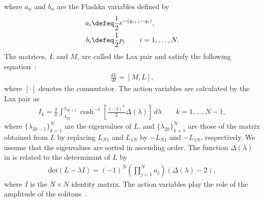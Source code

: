 where $a_n$ and $b_n$ are the Flashka variables defined by~\cite{Flaschka1974}
\begin{align}
  \begin{split}
    a_i & \defeq \frac{1}{2}e^{-(q_{i+1} - q_i)}, \\
    b_i & \defeq \frac{1}{2}p_i \qquad i=1,\ldots,N.
  \end{split}
\end{align}
The matrices, $L$ and $M$, are called the Lax pair and satisfy the following equation~\cite{Lax1968}:
\begin{align}
 \frac{dL}{dt} = [M, L],\label{eq:eom_lax_pair}
\end{align}
where $[\cdot]$ denotes the commutator.
The action variables are calculated by the Lax pair as~\cite{Flaschka-McLaughlin1976,Flaschka1974}
\begin{align}
  I_k = \frac{2}{\pi} \int_{\lambda_{2k}}^{\lambda_{2k+1}} \cosh^{-1}\left[\frac{(-1)^k}{2} \Delta(\lambda)\right] \, d\lambda \qquad k=1,\ldots,N-1, \label{eq:exact_toda_actions}
\end{align}
where $\{\lambda_{2k-1}\}_{k=1}^{N}$ are the eigenvalues of $L$, and $\{\lambda_{2k}\}_{k=1}^{N}$ are those of the matrix obtained from $L$ by replacing $L_{N1}$ and $L_{1N}$ by $-L_{N1}$ and $-L_{1N}$, respectively. We assume that the eigenvalues are sorted in ascending order.
The function $\Delta(\lambda)$ in  is related to the determinant of $L$ by
\begin{align}
  \mathrm{det}(L - \lambda I) = (-1)^N\left(\prod_{j=1}^{N}a_j\right) \left(\Delta(\lambda) - 2\right), \label{eq:discriminant}
\end{align}
where $I$ is the $N \times N$ identity matrix.
The action variables play the role of the amplitude of the solitons~\cite{Ferguson-Flaschka-McLaughlin1982}.


